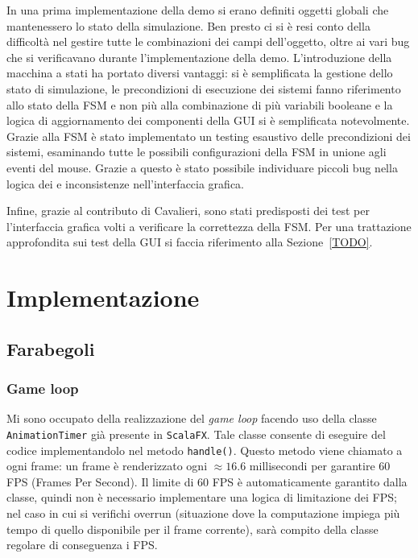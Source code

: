 In una prima implementazione della demo si erano definiti oggetti globali che mantenessero lo stato della simulazione.
Ben presto ci si è resi conto della difficoltà nel gestire tutte le combinazioni dei campi dell'oggetto, oltre
ai vari bug che si verificavano durante l'implementazione della demo.
L'introduzione della macchina a stati ha portato diversi vantaggi: si è semplificata la gestione dello
stato di simulazione, le precondizioni di esecuzione dei sistemi fanno riferimento allo stato della FSM e non più alla
combinazione di più variabili booleane e la logica di aggiornamento dei componenti della GUI si è semplificata
notevolmente.
Grazie alla FSM è stato implementato un testing esaustivo delle precondizioni dei sistemi, esaminando tutte
le possibili configurazioni della FSM in unione agli eventi del mouse.
Grazie a questo è stato possibile individuare piccoli bug nella logica dei \System e inconsistenze nell'interfaccia
grafica.

Infine, grazie al contributo di Cavalieri, sono stati predisposti dei test per l'interfaccia grafica volti a verificare
la correttezza della FSM. Per una trattazione approfondita sui test della GUI si faccia riferimento alla
Sezione~\ref{TODO}.

\section{Implementazione}\label{sec:demo-implementazione}

\subsection{Farabegoli}\label{subsec:demo-farabegoli}
\subsubsection{Game loop}
Mi sono occupato della realizzazione del \textit{game loop} facendo uso della classe \texttt{AnimationTimer} già
presente in \texttt{ScalaFX}.
Tale classe consente di eseguire del codice implementandolo nel metodo \texttt{handle()}.
Questo metodo viene chiamato a ogni frame: un frame è renderizzato ogni $\approx16.6$ millisecondi per garantire 60 FPS
(Frames Per Second).
Il limite di 60 FPS è automaticamente garantito dalla classe, quindi non è necessario implementare una logica di
limitazione dei FPS\@; nel caso in cui si verifichi overrun (situazione dove la computazione impiega più tempo di
quello disponibile per il frame corrente), sarà compito della classe regolare di conseguenza i FPS\@.

